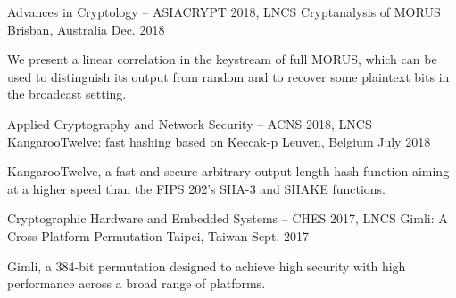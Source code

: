 \newpage
{}


\begin{cventries}

    \cventry
      {Advances in Cryptology – ASIACRYPT 2018, LNCS}
      {Cryptanalysis of MORUS} %
      {Brisban, Australia} %
      {Dec. 2018} %
      {
        \begin{cvitems} %
          \item {We present a linear correlation in the keystream of full MORUS, which can be used to distinguish its output from random and to recover some plaintext bits in the broadcast setting.}
        \end{cvitems}
      }

    \cventry
      {Applied Cryptography and Network Security – ACNS 2018, LNCS}
      {KangarooTwelve: fast hashing based on Keccak-p} %
      {Leuven, Belgium} %
      {July 2018} %
      {
        \begin{cvitems} %
          \item {KangarooTwelve, a fast and secure arbitrary output-length hash function aiming at a higher speed than the FIPS 202’s SHA-3 and SHAKE functions.}
        \end{cvitems}
      }

  \cventry
    {Cryptographic Hardware and Embedded Systems – CHES 2017, LNCS}
    {Gimli: A Cross-Platform Permutation} %
    {Taipei, Taiwan} %
    {Sept. 2017} %
    {
      \begin{cvitems} %
        \item {Gimli, a 384-bit permutation designed to achieve high security with high performance across a broad range of platforms.}
      \end{cvitems}
    }


\end{cventries}
